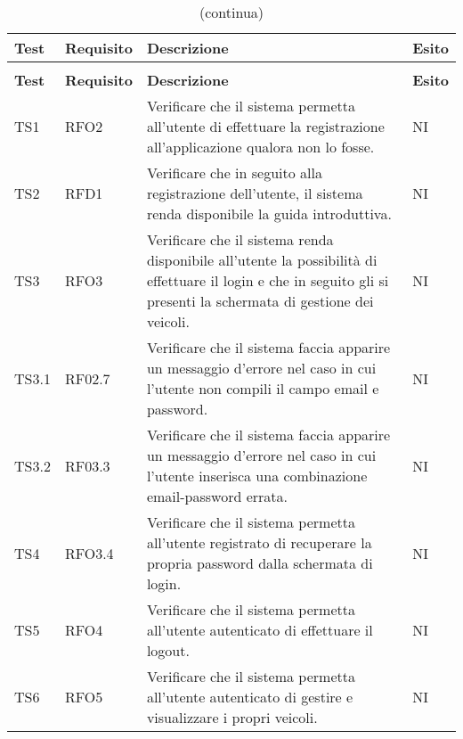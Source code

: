 	\begin{longtable}{ >{\centering}p{} >{\centering}p{} >{\centering}p{}
			>{\centering}p{}}%
			
		\caption{Riepilogo test di sistema}\\	
		\rowcolorhead
		\textbf{\color{white}Test} 
		& \textbf{\color{white}Requisito} 
		& \textbf{\color{white}Descrizione} 
		& \centering\textbf{\color{white}Esito}
		\tabularnewline %
		\endfirsthead	
		
		\rowcolor{white}\caption[]{(continua)}\\	
		\rowcolorhead
		\textbf{\color{white}Test} 
		& \textbf{\color{white}Requisito} 
		& \textbf{\color{white}Descrizione} 
		& \centering\textbf{\color{white}Esito}
		\tabularnewline %
		\endhead	
		
		TS1	& RFO2 & Verificare che il sistema permetta all'utente di effettuare la registrazione all'applicazione qualora non lo fosse. &	NI	\tabularnewline
		
		 TS2	& RFD1 & Verificare che in seguito alla registrazione dell'utente, il sistema renda disponibile la guida introduttiva.	&	NI	\tabularnewline
		 
		 TS3	& RFO3 & Verificare che il sistema renda disponibile all'utente la possibilità di effettuare il login e che in seguito gli si presenti la schermata di gestione dei veicoli. &	NI	\tabularnewline
		 
		 TS3.1 & RF02.7 & Verificare che il sistema faccia apparire un messaggio d'errore nel caso in cui l'utente non compili il campo email e password. &	NI	\tabularnewline
		 
		 TS3.2 & RF03.3 &	Verificare che il sistema faccia apparire un messaggio d'errore nel caso in cui l'utente inserisca una combinazione email-password errata. &	NI	\tabularnewline
		 
		 TS4 & RFO3.4	& Verificare che il sistema permetta all'utente registrato di recuperare la propria password dalla schermata di login.	&	NI	\tabularnewline
		 
		 TS5	& RFO4 & Verificare che il sistema permetta all'utente autenticato di effettuare il logout. &	 NI \tabularnewline
		  
		 TS6	& RFO5 & Verificare che il sistema permetta all'utente autenticato di gestire e visualizzare i propri veicoli.	&	NI	\tabularnewline
		  

\end{longtable}
